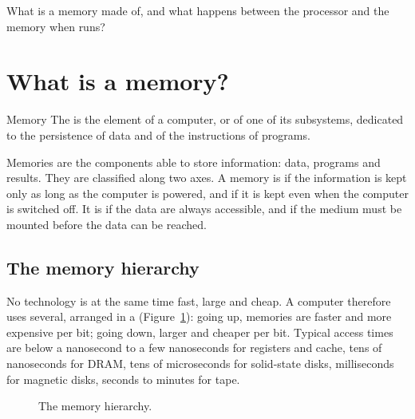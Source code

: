 What is a memory made of, and what happens between the processor and the
memory when  runs?

\section{What is a memory?}

\begin{definition}{Memory}
The  is the element of a computer, or of one of its subsystems,
dedicated to the persistence of data and of the instructions of programs.
\end{definition}

Memories are the components able to store information: data, programs and
results. They are classified along two axes. A memory is  if
the information is kept only as long as the computer is powered, and
 if it is kept even when the computer is switched off. It is
 if the data are always accessible, and  if the
medium must be mounted before the data can be reached.

\subsection{The memory hierarchy}

No technology is at the same time fast, large and cheap. A computer
therefore uses several, arranged in a 
(Figure~\ref{fig:mem:hier}): going up, memories are faster and more expensive
per bit; going down, larger and cheaper per bit. Typical access times are
below a nanosecond to a few nanoseconds for registers and cache, tens of
nanoseconds for DRAM, tens of microseconds for solid-state disks,
milliseconds for magnetic disks, seconds to minutes for tape.

\begin{figure}[htb]
\centering
{}
\caption{The memory hierarchy.}
\label{fig:mem:hier}
\end{figure}

